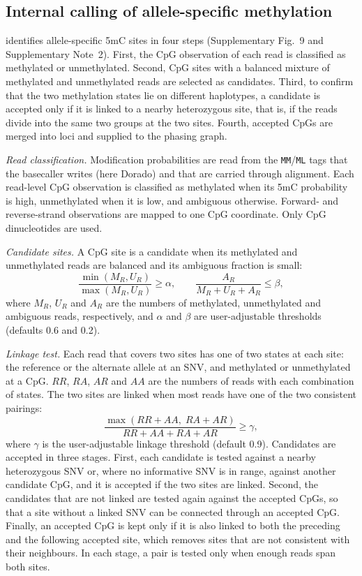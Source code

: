 \subsection*{Internal calling of allele-specific methylation}
\toolname identifies allele-specific 5mC sites in four steps (Supplementary Fig.~9 and Supplementary Note~2).  First, the CpG observation of each read is classified as methylated or unmethylated.  Second, CpG sites with a balanced mixture of methylated and unmethylated reads are selected as candidates.  Third, to confirm that the two methylation states lie on different haplotypes, a candidate is accepted only if it is linked to a nearby heterozygous site, that is, if the reads divide into the same two groups at the two sites.  Fourth, accepted CpGs are merged into loci and supplied to the phasing graph.

\emph{Read classification.}  Modification probabilities are read from the \texttt{MM}/\texttt{ML} tags that the basecaller writes (here Dorado\cite{ont2025dorado}) and that are carried through alignment.  Each read-level CpG observation is classified as methylated when its 5mC probability is high, unmethylated when it is low, and ambiguous otherwise.  Forward- and reverse-strand observations are mapped to one CpG coordinate.  Only CpG dinucleotides are used.

\emph{Candidate sites.}  A CpG site is a candidate when its methylated and unmethylated reads are balanced and its ambiguous fraction is small:
\begin{equation}
\frac{\min(M_R,U_R)}{\max(M_R,U_R)} \ge \alpha,
\qquad
\frac{A_R}{M_R+U_R+A_R} \le \beta,
\label{eq:hetmeth}
\end{equation}
where $M_R$, $U_R$ and $A_R$ are the numbers of methylated, unmethylated and ambiguous reads, respectively, and $\alpha$ and $\beta$ are user-adjustable thresholds (defaults 0.6 and 0.2).

\emph{Linkage test.}  Each read that covers two sites has one of two states at each site: the reference or the alternate allele at an SNV, and methylated or unmethylated at a CpG.  $RR$, $RA$, $AR$ and $AA$ are the numbers of reads with each combination of states.  The two sites are linked when most reads have one of the two consistent pairings:
\begin{equation}
\frac{\max(RR+AA,\;RA+AR)}{RR+AA+RA+AR} \ge \gamma,
\label{eq:linkmeth}
\end{equation}
where $\gamma$ is the user-adjustable linkage threshold (default 0.9).  Candidates are accepted in three stages.  First, each candidate is tested against a nearby heterozygous SNV or, where no informative SNV is in range, against another candidate CpG, and it is accepted if the two sites are linked.  Second, the candidates that are not linked are tested again against the accepted CpGs, so that a site without a linked SNV can be connected through an accepted CpG.  Finally, an accepted CpG is kept only if it is also linked to both the preceding and the following accepted site, which removes sites that are not consistent with their neighbours.  In each stage, a pair is tested only when enough reads span both sites.

